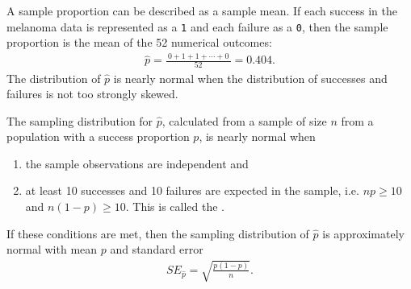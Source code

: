 A sample proportion can be described as a sample mean. If each success in the melanoma data  is represented as a \texttt{1} and each failure as a \texttt{0}, then the sample proportion is the mean of the 52 numerical outcomes:
\begin{eqnarray*}
\hat{p} = \frac{\ 0 + 1 + 1 + \cdots + 0\ }{52} = 0.404.
\end{eqnarray*}
The distribution of $\hat{p}$ is nearly normal when the distribution of successes and failures is not too strongly skewed.

\begin{termBox}{
The sampling distribution for $\hat{p}$, calculated from a sample of size $n$ from a population with a success proportion $p$, is nearly normal when
\begin{enumerate}
\item the sample observations are independent and
\item at least 10 successes and 10 failures are expected in the sample, i.e. $np\geq10$ and $n(1-p)\geq10$. This is called the .
\end{enumerate}

If these conditions are met, then the sampling distribution of $\hat{p}$ is approximately normal with mean $p$ and standard error
\begin{eqnarray}
SE_{\hat{p}} = \sqrt{\frac{p(1-p)}{n}}.
\label{seOfPHat}
\end{eqnarray}}
\end{termBox}

